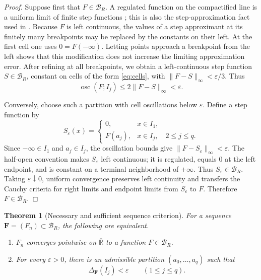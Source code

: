 \documentclass[11pt]{article}
\newtheorem{theorem}{Theorem}
\newcommand{\Rbar}{\overline{\mathbb R}}
\newcommand{\BR}{\mathcal B_R}
\newcommand{\osc}{\operatorname{osc}}
\begin{document}
\begin{proof}
Suppose first that \(F\in\BR\).  A regulated function on the compactified
line is a uniform limit of finite step functions
\cite[\S7.13]{McLeod}; this is also the step-approximation fact used in
\cite{Talvila}.  Because \(F\) is left continuous, the values of a step
approximant at its finitely many breakpoints may be replaced by the constants
on their left.  At the first cell one uses \(0=F(-\infty)\).  Letting points
approach a breakpoint from the left shows that this modification does not
increase the limiting approximation error.  After refining at all
breakpoints, we obtain a left-continuous step function \(S\in\BR\), constant
on cells of the form \eqref{eq:cells}, with
\(\lVert F-S\rVert_\infty<\varepsilon/3\).  Thus
\[
 \osc(F;I_j)\leq 2\lVert F-S\rVert_\infty<\varepsilon.
\]

Conversely, choose such a partition with cell oscillations below
\(\varepsilon\).  Define a step function by
\[
 S_\varepsilon(x)=
 \begin{cases}
  0,&x\in I_1,\\
  F(a_j),&x\in I_j,\quad 2\leq j\leq q.
 \end{cases}
\]
Since \(-\infty\in I_1\) and \(a_j\in I_j\), the oscillation bounds give
\(\lVert F-S_\varepsilon\rVert_\infty<\varepsilon\).
The half-open convention makes \(S_\varepsilon\) left continuous; it is
regulated, equals \(0\) at the left endpoint, and is constant on a terminal
neighborhood of \(+\infty\).  Thus \(S_\varepsilon\in\BR\).
Taking \(\varepsilon\downarrow0\), uniform convergence preserves left
continuity and transfers the Cauchy criteria for right limits and endpoint
limits from \(S_\varepsilon\) to \(F\).  Therefore \(F\in\BR\).
\end{proof}

\begin{theorem}[Necessary and sufficient sequence criterion]\label{thm:main}
For a sequence \(\mathbf F=(F_n)\subset\BR\), the following are equivalent.
\begin{enumerate}[label=\textup{(\roman*)}]
\item \(F_n\) converges pointwise on \(\Rbar\) to a function \(F\in\BR\).
\item For every \(\varepsilon>0\), there is an admissible partition
      \((a_0,\dots,a_q)\) such that
      \[
       \Delta_{\mathbf F}(I_j)<\varepsilon
       \qquad(1\leq j\leq q).
      \]
\end{enumerate}
\end{theorem}
\end{document}
